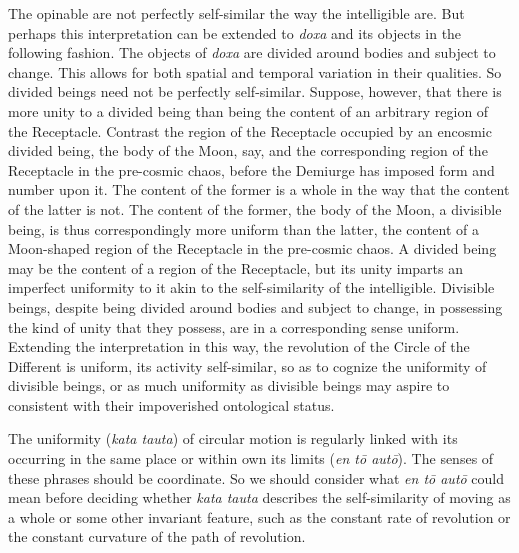 The opinable are not perfectly self-similar the way the intelligible are. But perhaps this interpretation can be extended to \emph{doxa} and its objects in the following fashion. The objects of \emph{doxa} are divided around bodies and subject to change. This allows for both spatial and temporal variation in their qualities. So divided beings need not be perfectly self-similar. Suppose, however, that there is more unity to a divided being than being the content of an arbitrary region of the Receptacle. Contrast the region of the Receptacle occupied by an encosmic divided being, the body of the Moon, say, and the corresponding region of the Receptacle in the pre-cosmic chaos, before the Demiurge has imposed form and number upon it. The content of the former is a whole in the way that the content of the latter is not. The content of the former, the body of the Moon, a divisible being, is thus correspondingly more uniform than the latter, the content of a Moon-shaped region of the Receptacle in the pre-cosmic chaos. A divided being may be the content of a region of the Receptacle, but its unity imparts an imperfect uniformity to it akin to the self-similarity of the intelligible. Divisible beings, despite being divided around bodies and subject to change, in possessing the kind of unity that they possess, are in a corresponding sense uniform. Extending the interpretation in this way, the revolution of the Circle of the Different is uniform, its activity self-similar, so as to cognize the uniformity of divisible beings, or as much uniformity as divisible beings may aspire to consistent with their impoverished ontological status.

The uniformity (\emph{kata tauta}) of circular motion is regularly linked with its occurring in the same place or within own its limits (\emph{en tō autō}). The senses of these phrases should be coordinate. So we should consider what \emph{en tō autō} could mean before deciding whether \emph{kata tauta} describes the self-similarity of moving as a whole or some other invariant feature, such as the constant rate of revolution or the constant curvature of the path of revolution.




